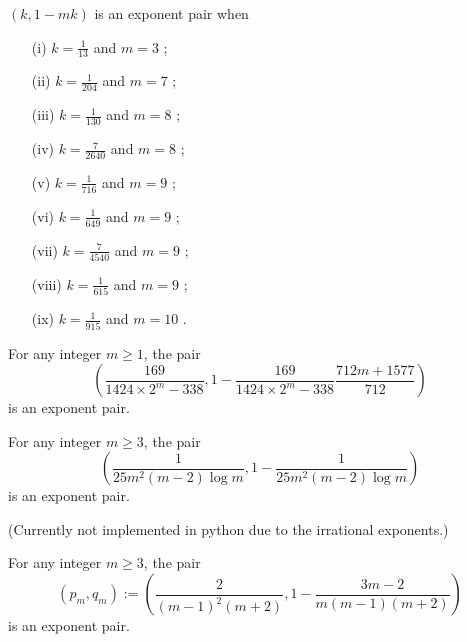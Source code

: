 \begin{theorem}\label{exp_pair_deriv_test} $(k,1-mk)$ is an exponent pair when
    \begin{itemize}
\item[(i)] $k=\frac{1}{13}$ and $m=3$ \cite[Theorem 1]{robert_fourth_2002};
\item[(ii)] $k = \frac{1}{204}$ and $m=7$ \cite[p. 231]{sargos_analog_2003};
\item[(iii)] $k = \frac{1}{130}$ and $m=8$ \cite[(1.1)]{robert_2002};
\item[(iv)] $k = \frac{7}{2640}$ and $m=8$ \cite[p. 231]{sargos_analog_2003};
\item[(v)] $k = \frac{1}{716}$ and $m=9$ \cite[p. 231]{sargos_analog_2003};
\item[(vi)] $k = \frac{1}{649}$ and $m=9$ \cite{Robert_Sargos_2001};
\item[(vii)] $k = \frac{7}{4540}$ and $m=9$ \cite[(1.2)]{robert_2002};
\item[(viii)] $k = \frac{1}{615}$ and $m=9$ \cite[(1.1)]{robert_2002};
\item[(ix)] $k = \frac{1}{915}$ and $m=10$ \cite[Th\'eor\`eme 2]{robert_2002b}.
\end{itemize}
\end{theorem}

\literature
{}


\begin{theorem}\label{huxley_exp_pair}\cite[Table 17.3]{huxley_area_1996}  For any integer $m \geq 1$, the pair
    $$ \left(\frac{169}{1424 \times 2^m - 338}, 1 - \frac{169}{1424 \times 2^m - 338} \frac{712m+1577}{712}\right)$$
is an exponent pair.
\end{theorem}

\literature
{}

\begin{theorem}\label{heath-brown_exp_pair_1996}\cite[(6.17.4)]{titchmarsh_theory_1986}  For any integer $m \geq 3$, the pair
$$ \left(\frac{1}{25m^2 (m-2) \log m}, 1 - \frac{1}{25 m^2 (m-2) \log m}\right)$$
is an exponent pair.
\end{theorem}

(Currently not implemented in python due to the irrational exponents.)

\begin{theorem}\label{heath-brown_exp_pair_2017}\cite[Theorem 2]{heathbrown_new_2017}
For any integer $m \geq 3$, the pair
$$ (p_m,q_m) := \left(\frac{2}{(m-1)^2(m+2)}, 1 - \frac{3m-2}{m(m-1)(m+2)}\right)$$
is an exponent pair.
\end{theorem}

